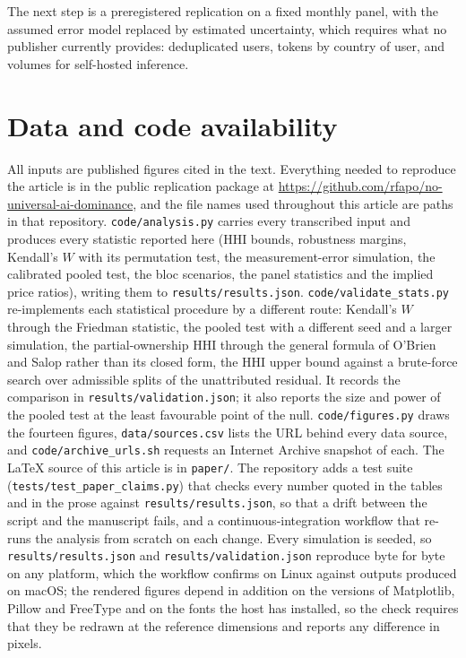 \documentclass[11pt]{article}
\begin{document}
The next step is a preregistered replication on a fixed monthly panel, with the assumed error model replaced by estimated uncertainty, which requires what no publisher currently provides: deduplicated users, tokens by country of user, and volumes for self-hosted inference.

\section*{Data and code availability}
All inputs are published figures cited in the text. Everything needed to reproduce the article is in the public replication package \cite{oliveira2026repo} at \url{https://github.com/rfapo/no-universal-ai-dominance}, and the file names used throughout this article are paths in that repository. \texttt{code/analysis.py} carries every transcribed input and produces every statistic reported here (HHI bounds, robustness margins, Kendall's $W$ with its permutation test, the measurement-error simulation, the calibrated pooled test, the bloc scenarios, the panel statistics and the implied price ratios), writing them to \texttt{results/results.json}. \texttt{code/validate\_stats.py} re-implements each statistical procedure by a different route: Kendall's $W$ through the Friedman statistic, the pooled test with a different seed and a larger simulation, the partial-ownership HHI through the general formula of O'Brien and Salop rather than its closed form, the HHI upper bound against a brute-force search over admissible splits of the unattributed residual. It records the comparison in \texttt{results/validation.json}; it also reports the size and power of the pooled test at the least favourable point of the null. \texttt{code/figures.py} draws the fourteen figures, \texttt{data/sources.csv} lists the URL behind every data source, and \texttt{code/archive\_urls.sh} requests an Internet Archive snapshot of each. The \LaTeX{} source of this article is in \texttt{paper/}. The repository adds a test suite (\texttt{tests/test\_paper\_claims.py}) that checks every number quoted in the tables and in the prose against \texttt{results/results.json}, so that a drift between the script and the manuscript fails, and a continuous-integration workflow that re-runs the analysis from scratch on each change. Every simulation is seeded, so \texttt{results/results.json} and \texttt{results/validation.json} reproduce byte for byte on any platform, which the workflow confirms on Linux against outputs produced on macOS; the rendered figures depend in addition on the versions of Matplotlib, Pillow and FreeType and on the fonts the host has installed, so the check requires that they be redrawn at the reference dimensions and reports any difference in pixels.
\end{document}
